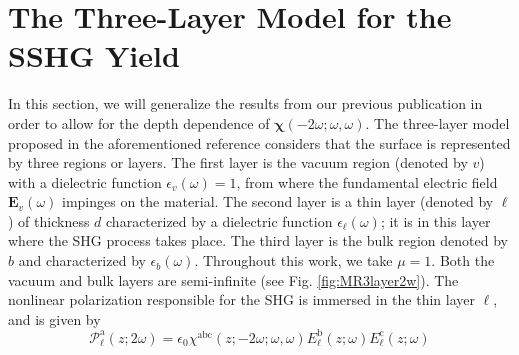 \documentclass[utf8]{frontiersSCNS}
\begin{document}


\section{The Three-Layer Model for the SSHG Yield}\label{sec:threelayer}

In this section, we will generalize the results from our previous publication
\citep{andersonPRB16b} in order to allow for the depth dependence of
$\boldsymbol{\chi}(-2\omega;\omega,\omega)$. The three-layer model proposed in
the aforementioned reference considers that the surface is represented by three
regions or layers. The first layer is the vacuum region (denoted by $v$) with a
dielectric function $\epsilon_{v}(\omega) = 1$, from where the fundamental
electric field $\mathbf{E}_{v}(\omega)$ impinges on the material. The second
layer is a thin layer (denoted by $\ell$) of thickness $d$ characterized by a
dielectric function $\epsilon_{\ell}(\omega)$; it is in this layer where the SHG
process takes place. The third layer is the bulk region denoted by $b$ and
characterized by $\epsilon_{b}(\omega)$. Throughout this work, we take $\mu =
1$. Both the vacuum and bulk layers are semi-infinite (see Fig.
\ref{fig:MR3layer2w}). The nonlinear polarization responsible for the SHG is
immersed in the thin layer $\ell$, and is given by
\begin{equation}\label{eq:tres}
\mathcal{P}^{\mathrm{a}}_{\ell}(z;2\omega)=
\epsilon_{0}\chi^{\mathrm{abc}}(z;-2\omega;\omega,\omega)
    E^{\mathrm{b}}_{\ell}(z;\omega)E^{\mathrm{c}}_{\ell}(z;\omega)
\end{equation}
\end{document}
